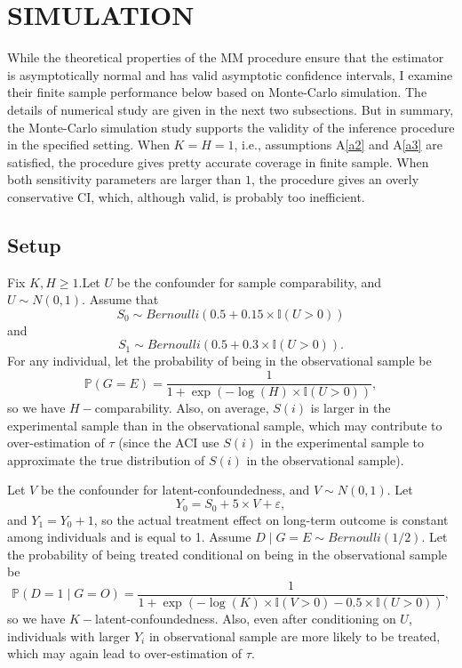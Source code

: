 \documentclass[12pt]{article}
\begin{document}
	
	\section{SIMULATION}
	
	While the theoretical properties of the MM procedure ensure that the estimator is asymptotically normal and has valid asymptotic confidence intervals, I examine their finite sample performance below based on Monte-Carlo simulation. The details of numerical study are given in the next two subsections. But in summary, the Monte-Carlo simulation study supports the validity of the inference procedure in the specified setting. When $K = H = 1$, i.e., assumptions A\ref{a2} and A\ref{a3} are satisfied, the procedure gives pretty accurate coverage in finite sample. When both sensitivity parameters are larger than $1$, the procedure gives an overly conservative CI, which, although valid, is probably too inefficient.

	\subsection{Setup}
	Fix $K,H \geq 1$.Let $U$ be the confounder for sample comparability, and $U \sim N(0,1)$. Assume that $$S_0 \sim Bernoulli(0.5 + 0.15 \times \mathbb{I}(U > 0))$$ and $$S_1 \sim Bernoulli(0.5 + 0.3 \times \mathbb{I}(U > 0)).$$
    For any individual, let the probability of being in the observational sample be $$\mathbb{P}(G = E) = \frac{1}{1 + \exp (-\log(H) \times \mathbb{I}(U > 0) )},$$ so we have $H-$comparability. Also, on average, $S(i)$ is larger in the experimental sample than in the observational sample, 
    which may contribute to over-estimation of $\tau$ (since the ACI use $S(i)$ in the experimental sample to approximate the true distribution of $S(i)$ in the observational sample). 

    Let $V$ be the confounder for latent-confoundedness, and $V \sim N(0,1)$. Let $$Y_0 = S_0 + 5 \times V + \varepsilon,$$ and $Y_1 = Y_0 + 1$, so the actual treatment effect on long-term outcome is constant among individuals and is equal to 1. Assume $D \mid G = E \sim Bernoulli(1/2)$.
    Let the probability of being treated conditional on being in the observational sample be $$\mathbb{P}(D = 1 \mid G = O) = \frac{1}{1 + \exp (-\log(K) \times \mathbb{I}(V > 0) - 0.5 \times \mathbb{I}(U > 0) )},$$ so we have $K-$latent-confoundedness. 
    Also, even after conditioning on $U$, individuals with larger $Y_i$ in observational sample are more likely to be treated, 
    which may again lead to over-estimation of $\tau$.
    
\end{document}
